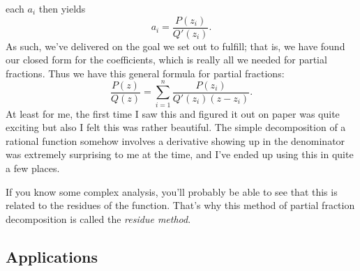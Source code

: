 each \( a_i \) then yields
\[
    a_i = \frac{P \left( z_i \right)}{Q' \left( z_i \right)}
.\]
As such, we've delivered on the goal we set out to fulfill; that is, we have found our closed form for the coefficients, which is really all we needed for partial fractions. Thus we have this general formula for partial fractions:
\[
    \frac{P \left( z \right)}{Q \left( z \right)} = \sum_{i = 1}^{n} \frac{P \left( z_i \right)}{Q' \left( z_i \right) \left( z - z_i \right)}
.\]
At least for me, the first time I saw this and figured it out on paper was
quite exciting but also I felt this was rather beautiful. The simple decomposition of a rational function somehow involves a derivative showing up in the denominator was extremely surprising to me at the time, and I've ended up using this in quite a few places.

If you know some complex analysis, you'll probably be able to see that this is related to the residues of the function. That's why this method of partial fraction decomposition is called the \textit{residue method}.

\subsection{Applications}

